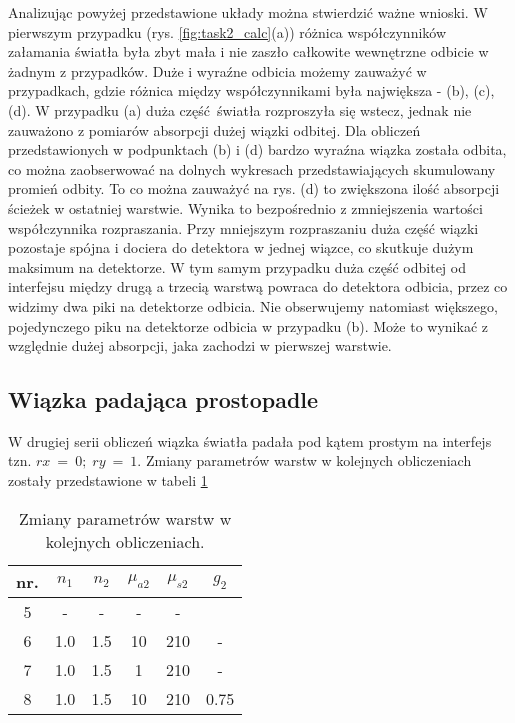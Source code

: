 \documentclass[a4paper, 12pt]{article}
\begin{document}
	\noindent Analizując powyżej przedstawione układy można stwierdzić ważne wnioski.
	W pierwszym przypadku (rys. \ref{fig:task2_calc}(a)) różnica współczynników załamania światła była zbyt mała i nie zaszło całkowite wewnętrzne odbicie w żadnym z przypadków.
	Duże i wyraźne odbicia możemy zauważyć w przypadkach, gdzie różnica między współczynnikami była największa - (b), (c), (d). 
	W przypadku (a) duża część światła rozproszyła się wstecz, jednak nie zauważono z pomiarów absorpcji dużej wiązki odbitej.  
	Dla obliczeń przedstawionych w podpunktach (b) i (d) bardzo wyraźna wiązka została odbita, co można zaobserwować na dolnych wykresach przedstawiających skumulowany promień odbity.
	To co można zauważyć na rys. (d) to zwiększona ilość absorpcji ścieżek w ostatniej warstwie. 
	Wynika to bezpośrednio z zmniejszenia wartości współczynnika rozpraszania. 
	Przy mniejszym rozpraszaniu duża część wiązki pozostaje spójna i dociera do detektora w jednej wiązce, co skutkuje dużym maksimum na detektorze.
	W tym samym przypadku duża część odbitej od interfejsu między drugą a trzecią warstwą powraca do detektora odbicia, przez co widzimy dwa piki na detektorze odbicia.
	Nie obserwujemy natomiast większego, pojedynczego piku na detektorze odbicia w przypadku (b). 
	Może to wynikać z względnie dużej absorpcji, jaka zachodzi w pierwszej warstwie.
	
	\newpage
	
	\subsection*{Wiązka padająca prostopadle}
		
	W drugiej serii obliczeń wiązka światła padała pod kątem prostym na interfejs tzn. $rx~=~0; \; ry~=~1$.
	Zmiany parametrów warstw w kolejnych obliczeniach zostały przedstawione w tabeli \ref{tab:task3}
	
	\begin{table}[H]
		\caption{Zmiany parametrów warstw w kolejnych obliczeniach.}
		\label{tab:task3}
		\centering
		\begin{tabular}{|c|c|c|c|c|c|}
			\hline
			\rowcolor{LightCyan}
			nr. & $n_1$ & $n_2$ & $\mu_{a2}$ & $\mu_{s2}$ & $g_2$ \\ \hline
			5 	& -		& -		& -  & -   & \\ \hline
			6	& 1.0 	& 1.5	& 10 & 210 & - \\ \hline
			7	& 1.0 	& 1.5	& 1  & 210 & - \\ \hline
			8 	& 1.0	& 1.5	& 10 & 210 & 0.75 \\ \hline
		\end{tabular}
	\end{table}
	
\end{document}
